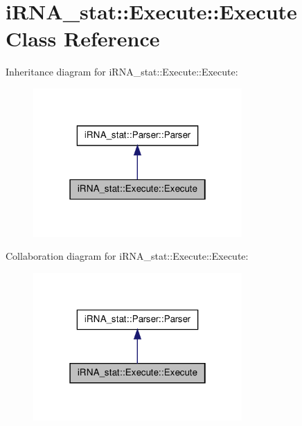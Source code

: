 \hypertarget{classiRNA__stat_1_1Execute_1_1Execute}{
\section{i\-R\-N\-A\-\_\-stat\-:\-:\-Execute\-:\-:\-Execute \-Class \-Reference}
\label{classiRNA__stat_1_1Execute_1_1Execute}
}


\-Inheritance diagram for i\-R\-N\-A\-\_\-stat\-:\-:\-Execute\-:\-:\-Execute\-:
\nopagebreak
\begin{figure}[H]
\begin{center}
\leavevmode
\includegraphics[width=226pt]{classiRNA__stat_1_1Execute_1_1Execute__inherit__graph}
\end{center}
\end{figure}


\-Collaboration diagram for i\-R\-N\-A\-\_\-stat\-:\-:\-Execute\-:\-:\-Execute\-:
\nopagebreak
\begin{figure}[H]
\begin{center}
\leavevmode
\includegraphics[width=226pt]{classiRNA__stat_1_1Execute_1_1Execute__coll__graph}
\end{center}
\end{figure}
